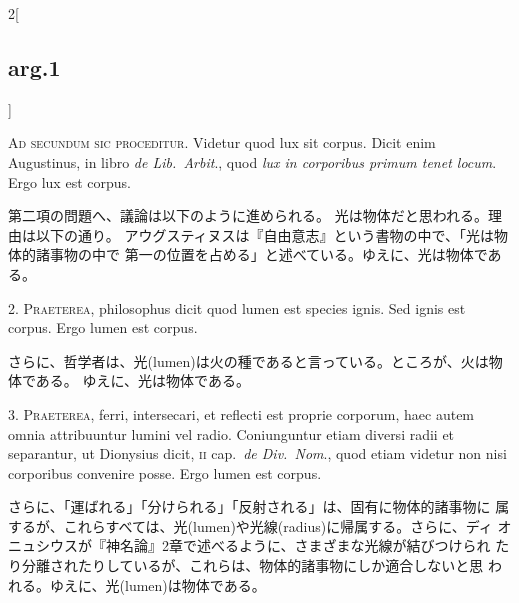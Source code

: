\documentclass[paper=a4paper,fontsize=10pt,jafontsize=9pt,titlepage]{jlreq}
\begin{document}
\begin{paracol}{2}[\subsection{arg.1}]

{\huge A}{\scshape d secundum sic proceditur}. Videtur quod lux sit
corpus. Dicit enim Augustinus, in libro {\itshape de Lib.~Arbit}., quod
{\itshape lux in corporibus primum tenet locum}. Ergo lux est corpus.

\switchcolumn

第二項の問題へ、議論は以下のように進められる。
光は物体だと思われる。理由は以下の通り。
アウグスティヌスは『自由意志』という書物の中で、「光は物体的諸事物の中で
 第一の位置を占める」と述べている。ゆえに、光は物体である。


{\scshape 2. Praeterea}, philosophus dicit quod lumen est
species ignis. Sed ignis est corpus. Ergo lumen est corpus.

\switchcolumn

さらに、哲学者は、光(lumen)は火の種であると言っている。ところが、火は物体である。
 ゆえに、光は物体である。


{\scshape 3. Praeterea}, ferri, intersecari, et reflecti
est proprie corporum, haec autem omnia attribuuntur lumini vel
radio. Coniunguntur etiam diversi radii et separantur, ut Dionysius
dicit, {\scshape ii} cap.~{\itshape de Div.~Nom}., quod etiam videtur non nisi corporibus
convenire posse. Ergo lumen est corpus.

\switchcolumn

さらに、「運ばれる」「分けられる」「反射される」は、固有に物体的諸事物に
 属するが、これらすべては、光(lumen)や光線(radius)に帰属する。さらに、ディ
 オニュシウスが『神名論』2章で述べるように、さまざまな光線が結びつけられ
 たり分離されたりしているが、これらは、物体的諸事物にしか適合しないと思
 われる。ゆえに、光(lumen)は物体である。

\switchcolumn*[\subsection{s.c.}]


\end{paracol}
\end{document}
